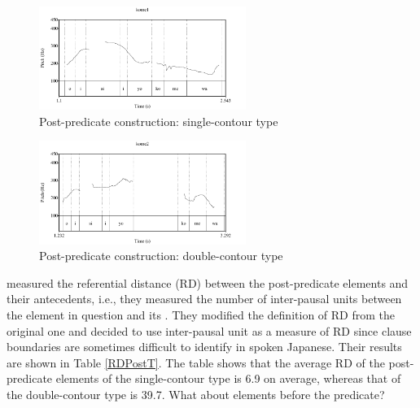 \begin{figure}
	\begin{center}
	\includegraphics[width=0.6\textwidth]{sounds/kome1.pdf}
	\caption{Post-predicate construction: single-contour type}
	\label{kome1F}
	\end{center}
\end{figure}
\begin{figure}
	\begin{center}
	\includegraphics[width=0.6\textwidth]{sounds/kome2.pdf}
	\caption{Post-predicate construction: double-contour type}
	\label{kome2F}
	\end{center}
\end{figure}

 measured the referential distance (RD) between the post-predicate elements and their antecedents,
i.e., they measured the number of inter-pausal units between the element in question and its .
They modified the definition of RD from the original one \cite{givon83} and decided to use inter-pausal unit as a measure of RD
since clause boundaries are sometimes difficult to identify in spoken Japanese.
Their results are shown in Table \ref{RDPostT}.
The table shows that the average RD of the post-predicate elements of the single-contour type is 6.9 on average,
whereas that of the double-contour type is 39.7.
What about elements before the predicate?

